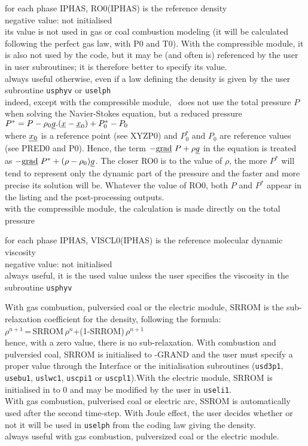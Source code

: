 {for each phase IPHAS, RO0(IPHAS) is the reference density\\
negative value: not initialised\\
its value is not used in gas or coal combustion modeling (it
will be calculated following the perfect gas law, with P0 and T0). With the
compressible module, it is also not used by the code, but it may be (and often
is) referenced by the user in user subroutines; it is therefore better to
specify its value.\\
always useful otherwise, even if a law defining the density is given by
the user subroutine \texttt{usphyv} or \texttt{uselph}\\
indeed, except with the
compressible module, \CS\ does not
use the total pressure $P$ when solving the Navier-Stokes equation, but a
reduced pressure \\
$P^*=P-\rho_0\underline{g}.(\underline{x}-\underline{x}_0)+P^*_0-P_0$\\
where
$\underline{x_0}$ is a reference point (see XYZP0) and $P^*_0$ and $P_0$ are
reference values (see PRED0 and P0). Hence, the term
$-\text{g}\underline{\text{rad}}\ {P}+\rho\underline{g}$ in the equation is treated as
$-\text{g}\underline{\text{rad}}\ {P^*}+(\rho-\rho_0)\underline{g}$. The closer RO0 is to the value of $\rho$,
the more $P^*$ will tend to represent only the dynamic part of the pressure and
the faster and more precise its solution will be. Whatever the value of RO0,
both $P$ and $P^*$ appear in the listing and the post-processing outputs.\\
with the compressible module, the calculation is made directly on the total
pressure}

{for each phase IPHAS,  VISCL0(IPHAS) is the reference molecular dynamic
viscosity\\
negative value: not initialised\\
always useful, it is the used value unless the user specifies the
viscosity in the subroutine \texttt{usphyv}}

{With gas combustion, pulversied coal or the electric module, SRROM
 is the sub-relaxation coefficient for the density, following the formula:\\
$\rho^{n+1}$\,=\,SRROM\,$\rho^n$+(1-SRROM)\,$\rho^{n+1}$\\
hence, with a zero value, there is no sub-relaxation.
With combustion and pulversied coal, SRROM is initialised to -GRAND
and the user must specify a proper value through the Interface or the
initialisation subroutines (\texttt{usd3p1},
 \texttt{usebu1}, \texttt{uslwc1}, \texttt{uscpi1} or
\texttt{uscpl1}).With the electric module, SRROM is initialised in to 0
and may be modified by the user in \texttt{useli1}.\\
With gas combustion, pulverised coal or electric arc, SSROM is
automatically used after the second time-step. With Joule effect,
the user decides whether or not it will be used in \texttt{uselph}
from the coding law giving the density.}\\
always useful with gas combustion, pulversized coal or the electric module.

